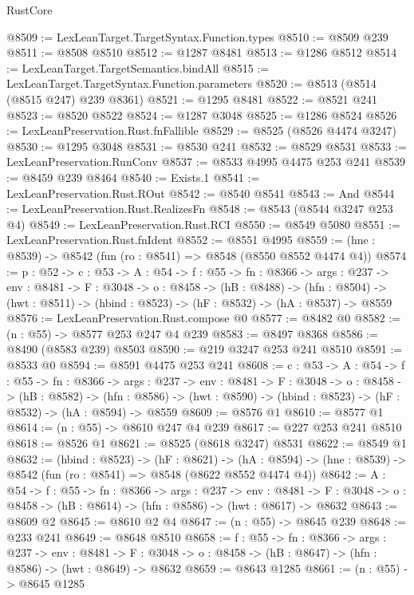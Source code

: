 \begin{lexlean}{RustCore}
\begin{coremodule}
@8509 := LexLeanTarget.TargetSyntax.Function.types
@8510 := @8509 @239
@8511 := @8508 @8510
@8512 := @1287 @8481
@8513 := @1286 @8512
@8514 := LexLeanTarget.TargetSemantics.bindAll
@8515 := LexLeanTarget.TargetSyntax.Function.parameters
@8520 := @8513 (@8514 (@8515 @247) @239 @8361)
@8521 := @1295 @8481
@8522 := @8521 @241
@8523 := @8520 @8522
@8524 := @1287 @3048
@8525 := @1286 @8524
@8526 := LexLeanPreservation.Rust.fnFallible
@8529 := @8525 (@8526 @4474 @3247)
@8530 := @1295 @3048
@8531 := @8530 @241
@8532 := @8529 @8531
@8533 := LexLeanPreservation.RunConv
@8537 := @8533 @4995 @4475 @253 @241
@8539 := @8459 @239 @8464
@8540 := Exists.{1}
@8541 := LexLeanPreservation.Rust.ROut
@8542 := @8540 @8541
@8543 := And
@8544 := LexLeanPreservation.Rust.RealizesFn
@8548 := @8543 (@8544 @3247 @253 @4)
@8549 := LexLeanPreservation.Rust.RCI
@8550 := @8549 @5080
@8551 := LexLeanPreservation.Rust.fnIdent
@8552 := @8551 @4995
@8559 := (hne : @8539) -> @8542 (fun (ro : @8541) => @8548 (@8550 @8552 @4474 @4))
@8574 := {p : @52} ->
  {c : @53} ->
  {A : @54} ->
  {f : @55} ->
  {fn : @8366} ->
  {args : @237} ->
  {env : @8481} ->
  {F : @3048} ->
  {o : @8458} ->
  (hB : @8488) ->
  (hfn : @8504) -> (hwt : @8511) -> (hbind : @8523) -> (hF : @8532) -> (hA : @8537) -> @8559
@8576 := LexLeanPreservation.Rust.compose @0
@8577 := @8482 @0
@8582 := (n : @55) -> @8577 @253 @247 @4 @239
@8583 := @8497 @8368
@8586 := @8490 (@8583 @239) @8503
@8590 := @219 @3247 @253 @241 @8510
@8591 := @8533 @0
@8594 := @8591 @4475 @253 @241
@8608 := {c : @53} ->
  {A : @54} ->
  {f : @55} ->
  {fn : @8366} ->
  {args : @237} ->
  {env : @8481} ->
  {F : @3048} ->
  {o : @8458} ->
  (hB : @8582) ->
  (hfn : @8586) -> (hwt : @8590) -> (hbind : @8523) -> (hF : @8532) -> (hA : @8594) -> @8559
@8609 := @8576 @1
@8610 := @8577 @1
@8614 := (n : @55) -> @8610 @247 @4 @239
@8617 := @227 @253 @241 @8510
@8618 := @8526 @1
@8621 := @8525 (@8618 @3247) @8531
@8622 := @8549 @1
@8632 := (hbind : @8523) ->
  (hF : @8621) ->
  (hA : @8594) -> (hne : @8539) -> @8542 (fun (ro : @8541) => @8548 (@8622 @8552 @4474 @4))
@8642 := {A : @54} ->
  {f : @55} ->
  {fn : @8366} ->
  {args : @237} ->
  {env : @8481} ->
  {F : @3048} -> {o : @8458} -> (hB : @8614) -> (hfn : @8586) -> (hwt : @8617) -> @8632
@8643 := @8609 @2
@8645 := @8610 @2 @4
@8647 := (n : @55) -> @8645 @239
@8648 := @233 @241
@8649 := @8648 @8510
@8658 := {f : @55} ->
  {fn : @8366} ->
  {args : @237} ->
  {env : @8481} ->
  {F : @3048} -> {o : @8458} -> (hB : @8647) -> (hfn : @8586) -> (hwt : @8649) -> @8632
@8659 := @8643 @1285
@8661 := (n : @55) -> @8645 @1285

\end{coremodule}
\end{lexlean}
